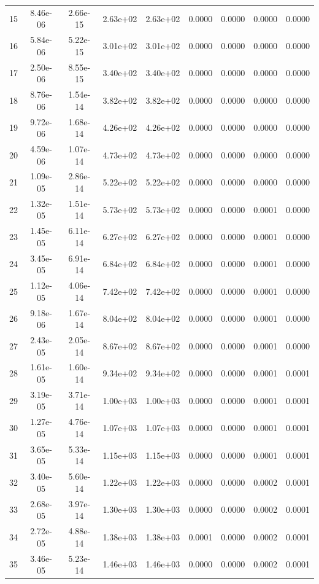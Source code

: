 \begin{longtable}{ccccccccc}
15 & 8.46e-06 & 2.66e-15 & 2.63e+02 & 2.63e+02 & 0.0000 & 0.0000 & 0.0000 & 0.0000 \\
16 & 5.84e-06 & 5.22e-15 & 3.01e+02 & 3.01e+02 & 0.0000 & 0.0000 & 0.0000 & 0.0000 \\
17 & 2.50e-06 & 8.55e-15 & 3.40e+02 & 3.40e+02 & 0.0000 & 0.0000 & 0.0000 & 0.0000 \\
18 & 8.76e-06 & 1.54e-14 & 3.82e+02 & 3.82e+02 & 0.0000 & 0.0000 & 0.0000 & 0.0000 \\
19 & 9.72e-06 & 1.68e-14 & 4.26e+02 & 4.26e+02 & 0.0000 & 0.0000 & 0.0000 & 0.0000 \\
20 & 4.59e-06 & 1.07e-14 & 4.73e+02 & 4.73e+02 & 0.0000 & 0.0000 & 0.0000 & 0.0000 \\
21 & 1.09e-05 & 2.86e-14 & 5.22e+02 & 5.22e+02 & 0.0000 & 0.0000 & 0.0000 & 0.0000 \\
22 & 1.32e-05 & 1.51e-14 & 5.73e+02 & 5.73e+02 & 0.0000 & 0.0000 & 0.0001 & 0.0000 \\
23 & 1.45e-05 & 6.11e-14 & 6.27e+02 & 6.27e+02 & 0.0000 & 0.0000 & 0.0001 & 0.0000 \\
24 & 3.45e-05 & 6.91e-14 & 6.84e+02 & 6.84e+02 & 0.0000 & 0.0000 & 0.0001 & 0.0000 \\
25 & 1.12e-05 & 4.06e-14 & 7.42e+02 & 7.42e+02 & 0.0000 & 0.0000 & 0.0001 & 0.0000 \\
26 & 9.18e-06 & 1.67e-14 & 8.04e+02 & 8.04e+02 & 0.0000 & 0.0000 & 0.0001 & 0.0000 \\
27 & 2.43e-05 & 2.05e-14 & 8.67e+02 & 8.67e+02 & 0.0000 & 0.0000 & 0.0001 & 0.0000 \\
28 & 1.61e-05 & 1.60e-14 & 9.34e+02 & 9.34e+02 & 0.0000 & 0.0000 & 0.0001 & 0.0001 \\
29 & 3.19e-05 & 3.71e-14 & 1.00e+03 & 1.00e+03 & 0.0000 & 0.0000 & 0.0001 & 0.0001 \\
30 & 1.27e-05 & 4.76e-14 & 1.07e+03 & 1.07e+03 & 0.0000 & 0.0000 & 0.0001 & 0.0001 \\
31 & 3.65e-05 & 5.33e-14 & 1.15e+03 & 1.15e+03 & 0.0000 & 0.0000 & 0.0001 & 0.0001 \\
32 & 3.40e-05 & 5.60e-14 & 1.22e+03 & 1.22e+03 & 0.0000 & 0.0000 & 0.0002 & 0.0001 \\
33 & 2.68e-05 & 3.97e-14 & 1.30e+03 & 1.30e+03 & 0.0000 & 0.0000 & 0.0002 & 0.0001 \\
34 & 2.72e-05 & 4.88e-14 & 1.38e+03 & 1.38e+03 & 0.0001 & 0.0000 & 0.0002 & 0.0001 \\
35 & 3.46e-05 & 5.23e-14 & 1.46e+03 & 1.46e+03 & 0.0000 & 0.0000 & 0.0002 & 0.0001 \\

\end{longtable}
